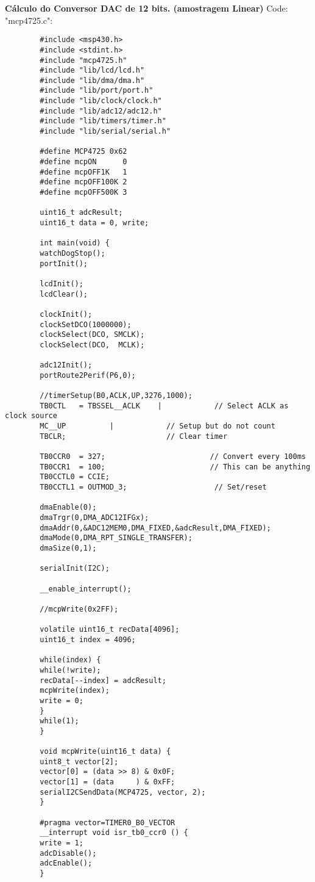 	\textbf{Cálculo do Conversor DAC de 12 bits. (amostragem Linear)}
	Code: "mcp4725.c":
	\begin{lstlisting}
		#include <msp430.h> 
		#include <stdint.h>
		#include "mcp4725.h"
		#include "lib/lcd/lcd.h"
		#include "lib/dma/dma.h"
		#include "lib/port/port.h"
		#include "lib/clock/clock.h"
		#include "lib/adc12/adc12.h"
		#include "lib/timers/timer.h"
		#include "lib/serial/serial.h"
		
		#define MCP4725 0x62
		#define mcpON      0
		#define mcpOFF1K   1
		#define mcpOFF100K 2
		#define mcpOFF500K 3
		
		uint16_t adcResult;
		uint16_t data = 0, write;
		
		int main(void) {
		watchDogStop();
		portInit();
		
		lcdInit();
		lcdClear();
		
		clockInit();
		clockSetDCO(1000000);
		clockSelect(DCO, SMCLK);
		clockSelect(DCO,  MCLK);
		
		adc12Init();
		portRoute2Perif(P6,0);
		
		//timerSetup(B0,ACLK,UP,3276,1000);
		TB0CTL   = TBSSEL__ACLK    |            // Select ACLK as clock source
		MC__UP          |            // Setup but do not count
		TBCLR;                       // Clear timer
		
		TB0CCR0  = 327;                        // Convert every 100ms
		TB0CCR1  = 100;                        // This can be anything
		TB0CCTL0 = CCIE;
		TB0CCTL1 = OUTMOD_3;                    // Set/reset
		
		dmaEnable(0);
		dmaTrgr(0,DMA_ADC12IFGx);
		dmaAddr(0,&ADC12MEM0,DMA_FIXED,&adcResult,DMA_FIXED);
		dmaMode(0,DMA_RPT_SINGLE_TRANSFER);
		dmaSize(0,1);
		
		serialInit(I2C);
		
		__enable_interrupt();
		
		//mcpWrite(0x2FF);
		
		volatile uint16_t recData[4096];
		uint16_t index = 4096;
		
		while(index) {
		while(!write);
		recData[--index] = adcResult;
		mcpWrite(index);
		write = 0;
		}
		while(1);
		}
		
		void mcpWrite(uint16_t data) {
		uint8_t vector[2];
		vector[0] = (data >> 8) & 0x0F;
		vector[1] = (data     ) & 0xFF;
		serialI2CSendData(MCP4725, vector, 2);
		}
		
		#pragma vector=TIMER0_B0_VECTOR
		__interrupt void isr_tb0_ccr0 () {
		write = 1;
		adcDisable();
		adcEnable();
		}
			
	\end{lstlisting}

